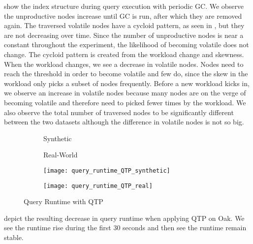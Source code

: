 \documentclass[abstracton,12pt]{scrartcl}
\theoremstyle{definition}
\begin{document}
 show the index
structure during query execution with periodic GC. We observe the unproductive
nodes increase until GC is run, after which they are removed again. The traversed 
volatile nodes have a cycloid pattern, as seen in
, but they are
not decreasing over time. Since the number of unproductive nodes is near a
constant throughout the experiment, the likelihood of becoming volatile does not
change. The cycloid pattern is created from the workload change and skewness.
When the workload changes, we see a decrease in volatile nodes. Nodes need to
reach the threshold in order to become volatile and few do, since the skew in
the workload only picks a subset of nodes frequently. Before a new workload
kicks in, we observe an increase in volatile nodes because many nodes are on the
verge of becoming volatile and therefore need to picked fewer times by the
workload. We also observe the total number of traversed nodes to be
significantly different between the two datasets although the difference in
volatile nodes is not so big.

\begin{figure}[H]
  \centering
  \begin{subfigure}{0.49\linewidth}
    \centering Synthetic
  \end{subfigure}
  \begin{subfigure}{0.49\linewidth}
    \centering Real-World
  \end{subfigure}
  \begin{subfigure}{0.49\linewidth}
    \texttt{[image: query\_runtime\_QTP\_synthetic]}
    \caption{}
    \label{fig:query_runtime_QTP_synthetic}
  \end{subfigure}
  \begin{subfigure}{0.49\linewidth}
    \texttt{[image: query\_runtime\_QTP\_real]}
    \caption{}
    \label{fig:query_runtime_QTP_real}
  \end{subfigure}
  \caption{Query Runtime with QTP}
\end{figure}

 depict the
resulting decrease in query runtime when applying QTP on Oak. We see the runtime
rise during the first 30 seconds and then see the runtime remain stable.
\end{document}
